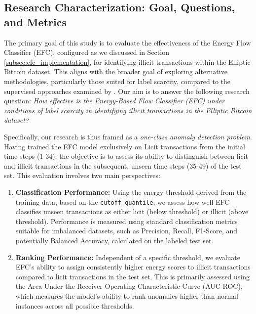 \documentclass[12pt]{article}
\begin{document}
\subsection{Research Characterization: Goal, Questions, and Metrics} \label{subsec:task}

The primary goal of this study is to evaluate the effectiveness of the Energy Flow Classifier (EFC), configured
as we discussed in Section \ref{subsec:efc_implementation}, for identifying illicit transactions within the Elliptic
Bitcoin dataset. This aligns with the broader goal of exploring alternative methodologies, particularly those suited for
label scarcity, compared to the supervised approaches examined by \cite{lorenz2021machinelearningmethodsdetect}. Our aim
is to answer the following research question: \emph{How effective is the Energy-Based Flow Classifier (EFC) under conditions
of label scarcity in identifying illicit transactions in the Elliptic Bitcoin dataset?}

Specifically, our research is thus framed as a \emph{one-class anomaly detection problem}. Having trained the EFC model
exclusively on Licit transactions from the initial time steps (1-34), the objective is to assess its ability to distinguish
between licit and illicit transactions in the subsequent, unseen time steps (35-49) of the test set. This evaluation involves
two main perspectives:

\begin{enumerate}
    \item \textbf{Classification Performance:} Using the energy threshold derived from the training data, based on the
      \texttt{cutoff\_quantile}, we assess how well EFC classifies unseen transactions as either licit (below threshold)
      or illicit (above threshold). Performance is measured using standard classification metrics suitable for imbalanced
      datasets, such as Precision, Recall, F1-Score, and potentially Balanced Accuracy, calculated on the labeled test set.
      
    \item \textbf{Ranking Performance:} Independent of a specific threshold, we evaluate EFC's ability to assign consistently
      higher energy scores to illicit transactions compared to licit transactions in the test set. This is primarily
      assessed using the Area Under the Receiver Operating Characteristic Curve (AUC-ROC), which measures the model's
      ability to rank anomalies higher than normal instances across all possible thresholds.
\end{enumerate}
\end{document}
